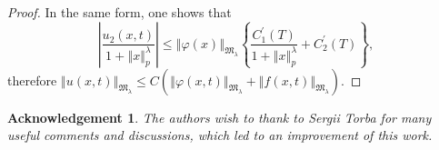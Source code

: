 \documentclass{amsart}\usepackage{amsfonts}
\theoremstyle{plain}
\newtheorem{acknowledgement}[theorem]{Acknowledgement}
\numberwithin{equation}{section}
\begin{document}
\begin{proof}
In the same form, one shows that
\[
\left\vert \frac{u_{2}(x,t)}{1+\left\Vert x\right\Vert _{p}^{\lambda}}\right\vert \leq\left\Vert \varphi\left(  x\right)  \right\Vert
_{\mathfrak{M}_{\lambda}}\left\{  \frac{C_{1}^{\prime}\left(  T\right)
}{1+\left\Vert x\right\Vert _{p}^{\lambda}}+C_{2}^{\prime}\left(  T\right)
\right\}  ,
\]
therefore $\left\Vert u\left(  x,t\right)  \right\Vert _{\mathfrak{M}_{\lambda}}\leq C\left(  \left\Vert \varphi\left(  x,t\right)  \right\Vert
_{\mathfrak{M}_{\lambda}}+\left\Vert f\left(  x,t\right)  \right\Vert
_{\mathfrak{M}_{\lambda}}\right)  $.
\end{proof}

\begin{acknowledgement}
The authors wish to thank to Sergii Torba for many useful comments and
discussions, which led to an improvement of this work.\bigskip
\end{acknowledgement}
\end{document}
